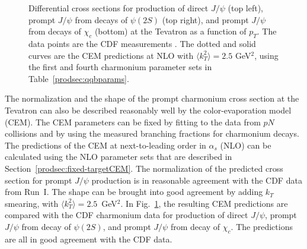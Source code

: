 \begin{figure}[htb]
\setlength{\epsfxsize=0.95\textwidth}
\setlength{\epsfysize=0.5\textheight}
\centerline{}
\caption{Differential cross sections for production of direct $J/\psi$
(top left), prompt $J/\psi$ from decays of $\psi(2S)$ (top right), and
prompt $J/\psi$ from decays of $\chi_c$ (bottom) at the Tevatron as a
function of $p_T$.  The data points are the CDF measurements
\cite{Abe:1997jz,Abe:1997yz}.  The dotted and solid curves are the CEM 
predictions at NLO with $\langle k_T^2\rangle = 2.5$ GeV$^2$, 
using the first and fourth charmonium parameter sets in 
Table~\ref{prodsec:qqbparams}.  }
\label{psicdfptdep}
\end{figure}

The normalization and the shape of the prompt charmonium cross section
at the Tevatron can also be described reasonably well by the
color-evaporation model (CEM).  
The CEM parameters can be fixed
by fitting to the data from $pN$ collisions and by
using the measured branching fractions for charmonium decays. The
predictions of the CEM at next-to-leading order in $\alpha_s$ (NLO)
can be calculated using the NLO parameter sets that are described in
Section~\ref{prodsec:fixed-targetCEM}. The normalization of the predicted
cross section for prompt $J/\psi$ production is in reasonable
agreement with the CDF data from Run~I. The shape can be brought into
good agreement by adding $k_T$ smearing, with $\langle k_T^2\rangle =
2.5$~GeV$^2$. In Fig.~\ref{psicdfptdep}, the resulting CEM predictions
are compared with the CDF charmonium data for production of direct
$J/\psi$, prompt $J/\psi$ from decay of $\psi(2S)$, and prompt $J/\psi$
from decay of $\chi_c$. The predictions are all in good agreement with
the CDF data.


